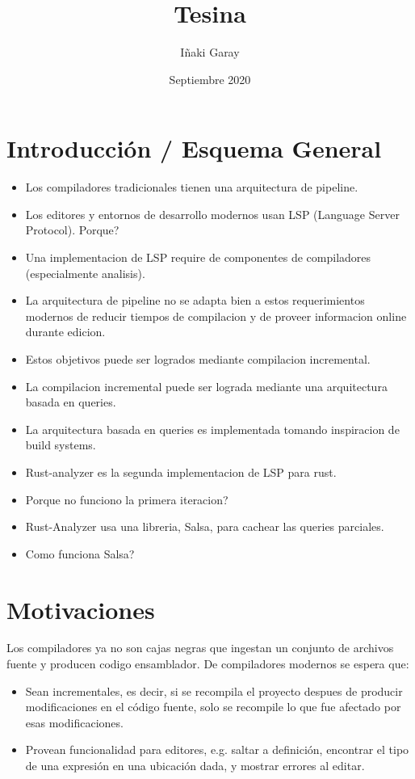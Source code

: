 \documentclass[12pt, a4paper]{report}
\title{Tesina}
\author{Iñaki Garay}
\date{Septiembre 2020}
\begin{document}
\begin{titlepage}
\maketitle
\end{titlepage}

\tableofcontents

\section*{Introducción / Esquema General}

\begin{itemize}[noitemsep]
\item Los compiladores tradicionales tienen una arquitectura de pipeline.
\item Los editores y entornos de desarrollo modernos usan LSP (Language Server Protocol). Porque?
\item Una implementacion de LSP require de componentes de compiladores (especialmente analisis).
\item La arquitectura de pipeline no se adapta bien a estos requerimientos modernos de reducir tiempos de compilacion y de proveer informacion online durante edicion.
\item Estos objetivos puede ser logrados mediante compilacion incremental.
\item La compilacion incremental puede ser lograda mediante una arquitectura basada en queries.
\item La arquitectura basada en queries es implementada tomando inspiracion de build systems.
\item Rust-analyzer es la segunda implementacion de LSP para rust.
\item Porque no funciono la primera iteracion?
\item Rust-Analyzer usa una libreria, Salsa, para cachear las queries parciales.
\item Como funciona Salsa?
\end{itemize}

\section*{Motivaciones}

Los compiladores ya no son cajas negras que ingestan un conjunto de
archivos fuente y producen codigo ensamblador.
De compiladores modernos se espera que:

\begin{itemize}[noitemsep]
\item Sean incrementales, es decir, si se recompila el proyecto
despues de producir modificaciones en el código fuente, solo se
recompile lo que fue afectado por esas modificaciones.
\item Provean funcionalidad para editores, e.g. saltar a definición,
encontrar el tipo de una expresión en una ubicación dada, y mostrar
errores al editar.
\end{itemize}
\end{document}

